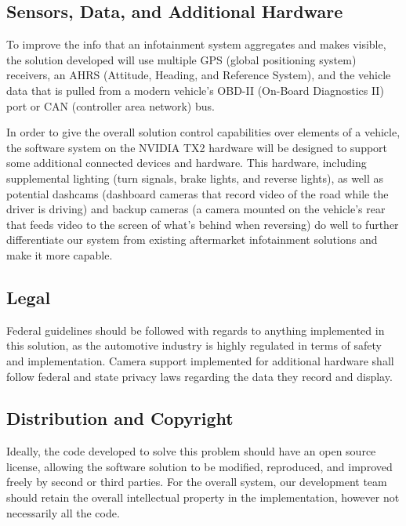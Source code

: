 \documentclass[onecolumn, draftclsnofoot,10pt, compsoc]{IEEEtran}
\begin{document}
\subsection{Sensors, Data, and Additional Hardware}
To improve the info that an infotainment system aggregates and makes visible, the solution developed will use multiple GPS (global positioning system) receivers, an AHRS (Attitude, Heading, and Reference System), and the vehicle data that is pulled from a modern vehicle's OBD-II (On-Board Diagnostics II) port or CAN (controller area network) bus.\par
In order to give the overall solution control capabilities over elements of a vehicle, the software system on the NVIDIA TX2 hardware will be designed to support some additional connected devices and hardware. This hardware, including supplemental lighting (turn signals, brake lights, and reverse lights), as well as potential dashcams (dashboard cameras that record video of the road while the driver is driving) and backup cameras (a camera mounted on the vehicle's rear that feeds video to the screen of what's behind when reversing) do well to further differentiate our system from existing aftermarket infotainment solutions and make it more capable.\par

\subsection{Legal}
Federal guidelines should be followed with regards to anything implemented in this solution, as the automotive industry is highly regulated in terms of safety and implementation. Camera support implemented for additional hardware shall follow federal and state privacy laws regarding the data they record and display.\par

\subsection{Distribution and Copyright}
Ideally, the code developed to solve this problem should have an open source license, allowing the software solution to be modified, reproduced, and improved freely by second or third parties. For the overall system, our development team should retain the overall intellectual property in the implementation, however not necessarily all the code.\par
\end{document}
